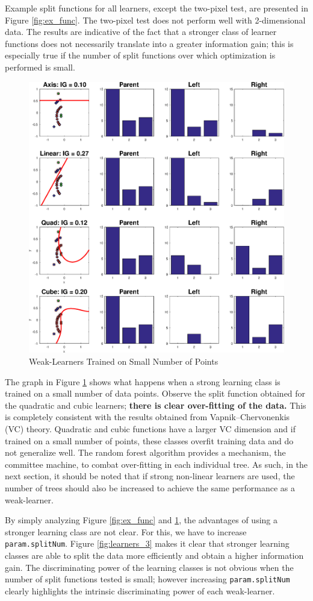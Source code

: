 \documentclass[a4paper,pra,twocolumn,10pt,aps,longbibliography,nobalancelastpage]{article}
\begin{document}
Example split functions for all learners, except the two-pixel test, are presented in Figure \ref{fig:ex_func}. The two-pixel test does not perform well with 2-dimensional data. The results are indicative of the fact that a stronger class of learner functions does not necessarily translate into a greater information gain; this is especially true if the number of split functions over which optimization is performed is small.

\begin{figure}[H]
	\centering
    \includegraphics[width=0.60\columnwidth]{split_function_visualitions_3}
    \caption{Weak-Learners Trained on Small Number of Points}
    \label{fig:learners_2}
\end{figure}

The graph in Figure \ref{fig:learners_2} shows what happens when a strong learning class is trained on a small number of data points. Observe the split function obtained for the quadratic and cubic learners; \textbf{there is clear over-fitting of the data.} This is completely consistent with the results obtained from Vapnik--Chervonenkis (VC) theory. Quadratic and cubic functions have a larger VC dimension and if trained on a small number of points, these classes overfit training data and do not generalize well. The random forest algorithm provides a mechanism, the committee machine, to combat over-fitting in each individual tree. As such, in the next section, it should be noted that if strong non-linear learners are used, the number of trees should also be increased to achieve the same performance as a weak-learner. 

By simply analyzing Figure \ref{fig:ex_func} and \ref{fig:learners_2}, the advantages of using a stronger learning class are not clear. For this, we have to increase \texttt{param.splitNum}. Figure \ref{fig:learners_3} makes it clear that stronger learning classes are able to split the data more efficiently and obtain a higher information gain. The discriminating power of the learning classes is not obvious when the number of split functions tested is small; however increasing \texttt{param.splitNum} clearly highlights the intrinsic discriminating power of each weak-learner. 
\end{document}

